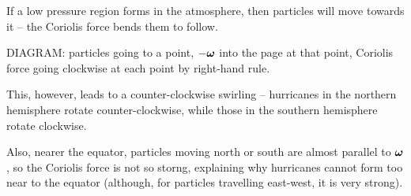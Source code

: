 \documentclass{../template/note}
\begin{document}
    \begin{example*}
        If a low pressure region forms in the atmosphere, then particles will move towards it -- the Coriolis force bends them to follow.

        DIAGRAM: particles going to a point, \(-\V \omega\) into the page at that point, Coriolis force going clockwise at each point by right-hand rule.

        This, however, leads to a counter-clockwise swirling -- hurricanes in the northern hemisphere rotate counter-clockwise, while those in the southern hemisphere rotate clockwise.

        Also, nearer the equator, particles moving north or south are almost parallel to \(\V \omega\), so the Coriolis force is not so storng, explaining why hurricanes cannot form too near to the equator (although, for particles travelling east-west, it is very strong).
    \end{example*}
    
\end{document}
